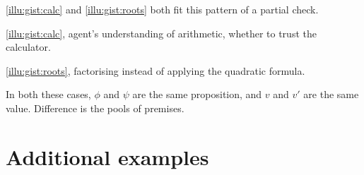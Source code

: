 \begin{note}
   \ref{illu:gist:calc} and \ref{illu:gist:roots} both fit this pattern of a partial check.

  \autoref{illu:gist:calc}, agent's understanding of arithmetic, whether to trust the calculator.

  \autoref{illu:gist:roots}, factorising instead of applying the quadratic formula.

  In both these cases, \(\phi\) and \(\psi\) are the same proposition, and \(v\) and \(v'\) are the same value.
  Difference is the pools of premises.
\end{note}

\section{Additional examples}

\subsection{}

